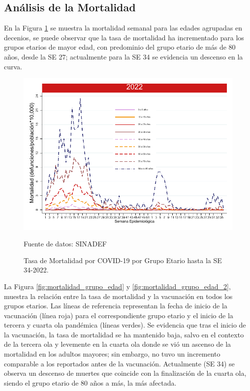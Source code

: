 \documentclass[12pt,a4paper,openany]{book}
\begin{document}
	\subsection*{Análisis de la Mortalidad}
	
	\noindent En la Figura \ref{fig:mortalidad_edad} se muestra la mortalidad semanal para las edades agrupadas en decenios, se puede observar que la tasa de mortalidad ha incrementado para los grupos etarios de mayor edad, con predominio del grupo etario de más de 80 años, desde la SE 27; actualmente para la SE 34 se evidencia un descenso en la curva.
	
	\begin{figure}[h]
		\caption{Tasa de Mortalidad por COVID-19 por Grupo Etario hasta la SE 34-2022.}\label{fig:mortalidad_edad}
		\begin{center}
			\includegraphics[width=0.65\linewidth]{../figuras/mortalidad_edad_2021_2022.pdf}
		\end{center}
		{\footnotesize Fuente de datos: SINADEF} 
	\end{figure}
	
	
	La Figura \ref{fig:mortalidad_grupo_edad} y 
	\ref{fig:mortalidad_grupo_edad_2},
	muestra la relación entre la tasa de mortalidad y la vacunación en todos los grupos etarios. Las líneas de referencia  representan la fecha de inicio de la vacunación (línea roja) para el correspondiente grupo etario y el inicio de la tercera y cuarta ola pandémica (líneas verdes). Se evidencia que tras el inicio de la vacunación, la tasa de mortalidad se ha mantenido baja, salvo en el contexto de la tercera ola y levemente en la cuarta ola donde se vió un ascenso de la mortalidad en los adultos mayores; sin embargo, no tuvo un incremento comparable a los reportados antes de la vacunación. Actualmente (SE 34) se observa un descenso de muertes que coincide con la finalización de la cuarta ola, siendo el grupo etario de 80 años a más, la más afectada.
	
\end{document}
